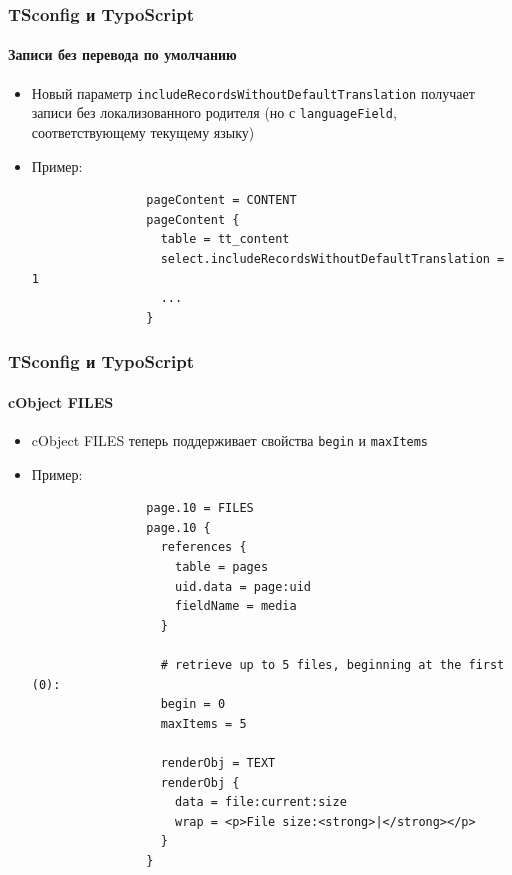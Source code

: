 
\begin{frame}[fragile]
	\frametitle{TSconfig и TypoScript}
	\framesubtitle{Записи без перевода по умолчанию}

	\begin{itemize}

		\item Новый параметр \texttt{includeRecordsWithoutDefaultTranslation}
			получает записи без локализованного родителя\newline
			(но с \texttt{languageField}, соответствующему текущему языку)

		\item Пример:

			\begin{lstlisting}
				pageContent = CONTENT
				pageContent {
				  table = tt_content
				  select.includeRecordsWithoutDefaultTranslation = 1
				  ...
				}
			\end{lstlisting}

	\end{itemize}

\end{frame}


\begin{frame}[fragile]
	\frametitle{TSconfig и TypoScript}
	\framesubtitle{cObject FILES}

	\begin{itemize}

		\item cObject FILES теперь поддерживает свойства \texttt{begin} и \texttt{maxItems}

		\item Пример:

			\lstset{
				basicstyle=\tiny\ttfamily
			}

			\begin{lstlisting}
				page.10 = FILES
				page.10 {
				  references {
				    table = pages
				    uid.data = page:uid
				    fieldName = media
				  }

				  # retrieve up to 5 files, beginning at the first (0):
				  begin = 0
				  maxItems = 5

				  renderObj = TEXT
				  renderObj {
				    data = file:current:size
				    wrap = <p>File size:<strong>|</strong></p>
				  }
				}
			\end{lstlisting}

	\end{itemize}

\end{frame}

